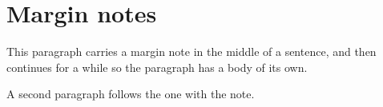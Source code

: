 \section{Margin notes}

This paragraph carries a margin note in the
middle of a sentence, and then continues for a while so the paragraph has a
body of its own.

A second paragraph follows the one with the note.
